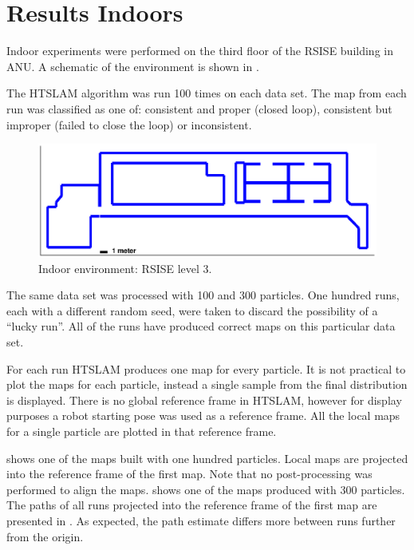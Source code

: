 \section {Results Indoors}

Indoor experiments were performed on the third floor of the RSISE
building in ANU. A schematic of the environment is shown in
.

The HTSLAM algorithm was run 100 times on each data set. The map from
each run was classified as one of: consistent and proper (closed
loop), consistent but improper (failed to close the loop) or
inconsistent.

 
\begin{figure}[htbp]
  \centering
  \includegraphics[width=13cm]{Pics/rsise_level3_map}
  \caption{Indoor environment: RSISE level 3.}
  \label{fig:rsise_level3_map}
\end{figure}

The same data set was processed with 100 and 300 particles. One
hundred runs, each with a different random seed, were taken to discard
the possibility of a ``lucky run''. All of the runs have produced
correct maps on this particular data set.

For each run HTSLAM produces one map for every particle. It is not
practical to plot the maps for each particle, instead a single sample
from the final distribution is displayed. There is no global reference
frame in HTSLAM, however for display purposes a robot starting pose was
used as a reference frame. All the local maps for a single particle
are plotted in that reference frame.

 shows one of the maps built with one
hundred particles. Local maps are projected into the reference frame
of the first map. Note that no post-processing was performed to align
the maps.  shows one of the maps
produced with 300 particles. The paths of all runs projected into the
reference frame of the first map are presented in
. As expected, the path estimate differs
more between runs further from the origin.


